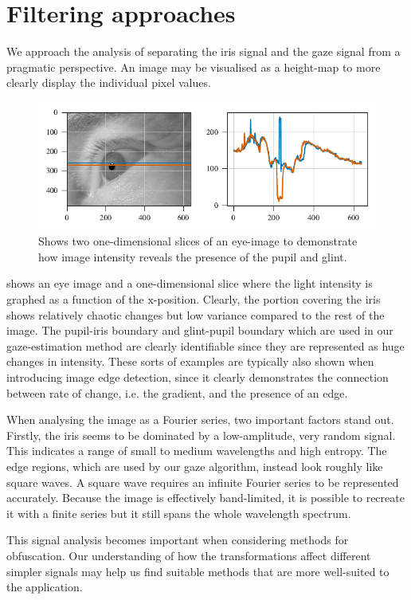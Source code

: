 \section{Filtering approaches}
We approach the analysis of separating the iris signal and the gaze signal from a pragmatic perspective. An image may be visualised as a height-map to more clearly display the individual pixel values. 

\begin{figure}
	\includegraphics[width=1\textwidth]{figures/1dimage}
	\caption{Shows two one-dimensional slices of an eye-image to demonstrate how image intensity reveals the presence of the pupil and glint.}\label{fig:1dimage}
\end{figure}

 shows an eye image and a one-dimensional slice where the light intensity is graphed as a function of the x-position. Clearly, the portion covering the iris shows relatively chaotic changes but low variance compared to the rest of the image. The pupil-iris boundary and glint-pupil boundary which are used in our gaze-estimation method are clearly identifiable since they are represented as huge changes in intensity. These sorts of examples are typically also shown when introducing image edge detection, since it clearly demonstrates the connection between rate of change, i.e. the gradient, and the presence of an edge. 

When analysing the image as a Fourier series, two important factors stand out. Firstly, the iris seems to be dominated by a low-amplitude, very random signal. This indicates a range of small to medium wavelengths and high entropy. The edge regions, which are used by our gaze algorithm, instead look roughly like square waves. A square wave requires an infinite Fourier series to be represented accurately. Because the image is effectively band-limited, it is possible to recreate it with a finite series but it still spans the whole wavelength spectrum.

This signal analysis becomes important when considering methods for obfuscation. Our understanding of how the transformations affect different simpler signals may help us find suitable methods that are more well-suited to the application.

